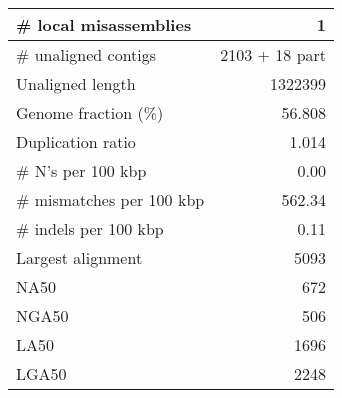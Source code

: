 \documentclass[12pt,a4paper]{article}
\begin{document}
\begin{table}[ht]
\begin{center}
\begin{tabular}{|l*{1}{|r}|}
\# local misassemblies & 1 \\ \hline
\# unaligned contigs & 2103 + 18 part \\ \hline
Unaligned length & 1322399 \\ \hline
Genome fraction (\%) & 56.808 \\ \hline
Duplication ratio & 1.014 \\ \hline
\# N's per 100 kbp & 0.00 \\ \hline
\# mismatches per 100 kbp & 562.34 \\ \hline
\# indels per 100 kbp & 0.11 \\ \hline
Largest alignment & 5093 \\ \hline
NA50 & 672 \\ \hline
NGA50 & 506 \\ \hline
LA50 & 1696 \\ \hline
LGA50 & 2248 \\ \hline
\end{tabular}
\end{center}
\end{table}
\end{document}
